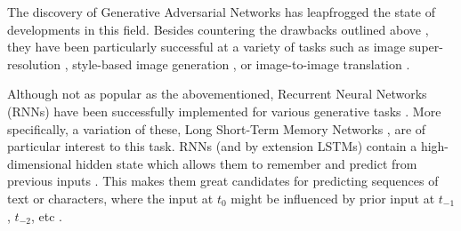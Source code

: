\documentclass[a4paper]{book}
\begin{document}
The discovery of Generative Adversarial Networks \parencite[GANs;][]{goodfellow_generative_2014} has leapfrogged the state of developments in this field. Besides countering the drawbacks outlined above \parencite{goodfellow_nips_2016}, they have been particularly successful at a variety of tasks such as image super-resolution \parencite[; see Figure \ref{fig:srgan}]{ledig_photo-realistic_2016}, style-based image generation \parencite{karras_style-based_2018}, or image-to-image translation \parencite[such as converting a satellite image into a map, or a sketch into a photorealistic image;][;see Figure \ref{fig:pix2pix}]{isola_image--image_2016}.

Although not as popular as the abovementioned, Recurrent Neural Networks (RNNs) have been successfully implemented for various generative tasks \parencite{jenal_rnn-based_2019, ICML2011Sutskever_524}. More specifically, a variation of these, Long Short-Term Memory Networks \parencite[LSTMs;][]{hochreiter_long_1997}, are of particular interest to this task. RNNs (and by extension LSTMs) contain a high-dimensional hidden state which allows them to remember and predict from previous inputs \parencite{ICML2011Sutskever_524}. This makes them great candidates for predicting sequences \parencite{graves_generating_2013} of text or characters, where the input at $t_0$ might be influenced by prior input at $t_{-1}$, $t_{-2}$, etc \parencite{fan_tts_2014}.
\end{document}

